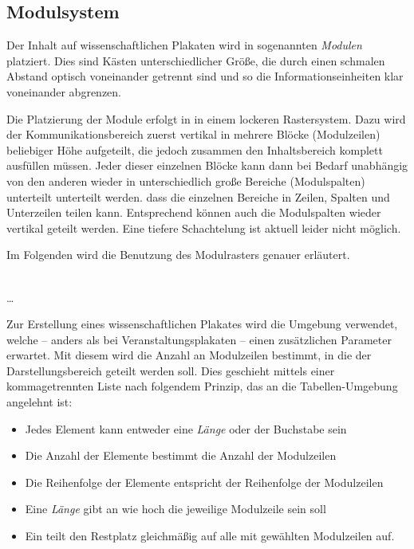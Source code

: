 \subsection{Modulsystem}

Der Inhalt auf wissenschaftlichen Plakaten wird in sogenannten \emph{Modulen}
platziert.
Dies sind Kästen unterschiedlicher Größe, die durch einen schmalen Abstand optisch
voneinander getrennt sind und so die Informationseinheiten klar voneinander
abgrenzen.

Die Platzierung der Module erfolgt in \tubslatex in einem lockeren Rastersystem.
Dazu wird der Kommunikationsbereich zuerst vertikal in mehrere Blöcke (Modulzeilen)
beliebiger Höhe aufgeteilt, die jedoch zusammen den Inhaltsbereich
komplett ausfüllen müssen.
Jeder dieser einzelnen Blöcke kann dann bei Bedarf unabhängig von den anderen
wieder in unterschiedlich große Bereiche (Modulspalten) unterteilt unterteilt werden.
dass die einzelnen Bereiche in Zeilen, Spalten und Unterzeilen teilen kann.
Entsprechend können auch die Modulspalten wieder vertikal geteilt werden.
Eine tiefere Schachtelung ist aktuell leider nicht möglich.


Im Folgenden wird die Benutzung des Modulrasters genauer erläutert.

\begin{Declaration}
    \\
  \quad\dots\\
\end{Declaration}

Zur Erstellung eines wissenschaftlichen Plakates wird die Umgebung
 verwendet, welche -- anders als bei Veranstaltungsplakaten --
einen zusätzlichen Parameter  erwartet.
Mit diesem wird die Anzahl an Modulzeilen bestimmt,
in die der Darstellungsbereich geteilt werden soll.
Dies geschieht mittels einer kommagetrennten Liste nach folgendem Prinzip,
das an die Tabellen-Umgebung  angelehnt ist:
\begin{itemize}
  \item Jedes Element kann entweder eine \emph{Länge} oder der Buchstabe  sein
  \item Die Anzahl der Elemente bestimmt die Anzahl der Modulzeilen
  \item Die Reihenfolge der Elemente entspricht der Reihenfolge der Modulzeilen
  \item Eine \emph{Länge} gibt an wie hoch die jeweilige Modulzeile sein soll
  \item Ein  teilt den Restplatz gleichmäßig auf alle mit
     gewählten Modulzeilen auf.
\end{itemize}


